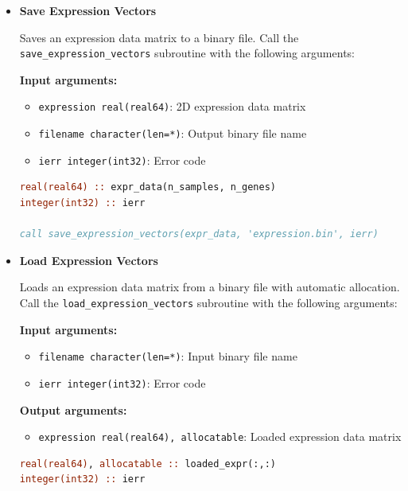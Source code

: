 \documentclass[11pt]{article}
\begin{document}
\begin{enumerate}
\begin{itemize}
\begin{lstlisting}[language=Fortran, caption={Load Gene IDs Array}]
call load_gene_ids(loaded_gene_ids, 'gene_ids.bin', ierr)
! loaded_gene_ids automatically allocated with correct size 
! and character length
	      	      \end{lstlisting}
	      	      
	      	\item \textbf{Save Expression Vectors}
	      	      
	      	      Saves an expression data matrix to a binary file. Call the \texttt{save\_expression\_vectors}
	      	      subroutine with the following arguments:
	      	      
	      	      \textbf{Input arguments:}
	      	      \begin{itemize}
	      	      	\item \texttt{expression real(real64)}: 2D expression data matrix
	      	      	      
	      	      	\item \texttt{filename character(len=*)}: Output binary file name
	      	      	      
	      	      	\item \texttt{ierr integer(int32)}: Error code
	      	      \end{itemize}
	      	      \begin{lstlisting}[language=Fortran, caption={Save Expression Data}]
real(real64) :: expr_data(n_samples, n_genes)
integer(int32) :: ierr

call save_expression_vectors(expr_data, 'expression.bin', ierr)
	      	      \end{lstlisting}
	      	      
	      	\item \textbf{Load Expression Vectors}
	      	      
	      	      Loads an expression data matrix from a binary file with automatic allocation.
	      	      Call the \texttt{load\_expression\_vectors} subroutine with the following
	      	      arguments:
	      	      
	      	      \textbf{Input arguments:}
	      	      \begin{itemize}
	      	      	\item \texttt{filename character(len=*)}: Input binary file name
	      	      	      
	      	      	\item \texttt{ierr integer(int32)}: Error code
	      	      \end{itemize}
	      	      \textbf{Output arguments:}
	      	      \begin{itemize}
	      	      	\item \texttt{expression real(real64), allocatable}: Loaded expression
	      	      	      data matrix
	      	      \end{itemize}
	      	      \begin{lstlisting}[language=Fortran, caption={Load Expression Data}]
real(real64), allocatable :: loaded_expr(:,:)
integer(int32) :: ierr


\end{lstlisting}
\end{itemize}
\end{enumerate}
\end{document}
